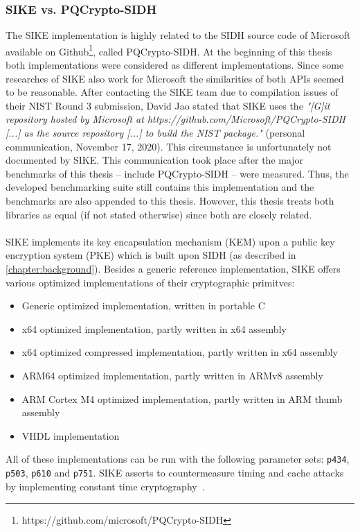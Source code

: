 \subsubsection{SIKE vs. PQCrypto-SIDH}\label{existing:sike_vs_pqcrypto}
The \gls{SIKE} implementation is highly related to the \gls{SIDH} source code of Microsoft available on Github\footnote{https://github.com/microsoft/PQCrypto-SIDH}, called \gls{PQCrypto-SIDH}. At the beginning of this thesis both implementations were considered as different implementations. Since some researches of \gls{SIKE} also work for Microsoft the similarities of both APIs seemed to be reasonable. After contacting the \gls{SIKE} team due to compilation issues of their NIST Round 3 submission, David Jao stated that \gls{SIKE} uses the \textit{"[G]it repository hosted by Microsoft at
https://github.com/Microsoft/PQCrypto-SIDH [...] as the source
repository [...] to build the NIST package."} (personal communication, November 17, 2020). This circumstance is unfortunately not documented by \gls{SIKE}. This communication took place after the major benchmarks of this thesis -- include \gls{PQCrypto-SIDH} -- were measured. Thus, the developed benchmarking suite still contains this implementation and the benchmarks are also appended to this thesis. However, this thesis treats both libraries as equal (if not stated otherwise) since both are closely related.
\\\\
\gls{SIKE} implements its key encapsulation mechanism (\gls{KEM}) upon a public key encryption system (\gls{PKE}) which is built upon \gls{SIDH} (as described in \autoref{chapter:background}). Besides a generic reference implementation, \gls{SIKE} offers various optimized implementations of their cryptographic primitves:
\begin{itemize}
  \item Generic optimized implementation, written in portable C
  \item x64 optimized implementation, partly written in x64 assembly
  \item x64 optimized compressed implementation, partly written in x64 assembly
  \item ARM64 optimized implementation, partly written in ARMv8 assembly
  \item ARM Cortex M4 optimized implementation, partly written in ARM thumb assembly
  \item VHDL implementation
\end{itemize}
All of these implementations can be run with the following parameter sets: \texttt{p434}, \texttt{p503}, \texttt{p610} and \texttt{p751}. \gls{SIKE} asserts to countermeasure timing and cache attacks by implementing constant time cryptography~\parencite{sike2020spec}.

